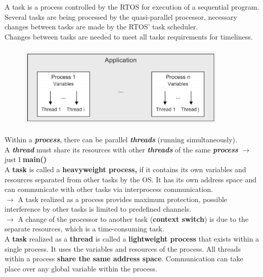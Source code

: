 A task is a process controlled by the RTOS for execution of a sequential program. Several tasks are being processed by the quasi-parallel processor, necessary changes between tasks are made by the RTOS' task scheduler.\\

Changes between tasks are needed to meet all tasks requirements for timeliness.

	\begin{figure}[h]
    \centering
    \includegraphics[width=10cm, height=4cm]{Images/image80.png}
    \label{fig:Fig }
    \end{figure}

Within a \textbf{\textit{process}}, there can be parallel \textbf{\textit{threads}} (running simultaneously). \\

A \textbf{\textit{thread}} must share its resources with other \textbf{\textit{threads}} of the same \textbf{\textit{process}} $\rightarrow$  just${}_{\ }$1${}_{\ }$\textbf{main()}\\

A \textbf{task} is called a \textbf{heavyweight process, }if it contains its own variables and resources separated from other tasks by the OS. It has its own address space and can communicate with other tasks via interprocess communication. \\

$\rightarrow$ A task realized as a process provides maximum protection, possible interference by other tasks is limited to predefined channels. \\

$\rightarrow$ A change of the processor to another task (\textbf{context switch}) is due to the separate resources, which is a time-consuming task.\\

A \textbf{task} realized as a \textbf{thread} is called a \textbf{lightweight process} that exists within a single process. It uses the variables and resources of the process. All threads within a process \textbf{share the same address space}. Communication can take place over any global variable within the process.

